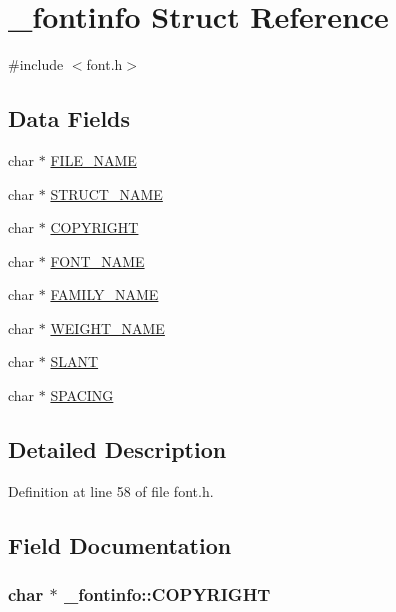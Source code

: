 \hypertarget{struct__fontinfo}{\section{\-\_\-fontinfo Struct Reference}
\label{struct__fontinfo}
}


{\ttfamily \#include $<$font.\-h$>$}

\subsection*{Data Fields}
\begin{DoxyCompactItemize}
\item 
char $\ast$ \hyperlink{struct__fontinfo_a86ca02a864b7dccb21004f51bea22ed3}{F\-I\-L\-E\-\_\-\-N\-A\-M\-E}
\item 
char $\ast$ \hyperlink{struct__fontinfo_a861ecb4b5f190ccd1e71b38270240f86}{S\-T\-R\-U\-C\-T\-\_\-\-N\-A\-M\-E}
\item 
char $\ast$ \hyperlink{struct__fontinfo_a7f4b0949fe49cf3fac04f225e1f36ed2}{C\-O\-P\-Y\-R\-I\-G\-H\-T}
\item 
char $\ast$ \hyperlink{struct__fontinfo_a6c0f76f2668446a1c37ecab8d4e286a5}{F\-O\-N\-T\-\_\-\-N\-A\-M\-E}
\item 
char $\ast$ \hyperlink{struct__fontinfo_a4af43750caadb3ae9d7375f0afdcd171}{F\-A\-M\-I\-L\-Y\-\_\-\-N\-A\-M\-E}
\item 
char $\ast$ \hyperlink{struct__fontinfo_a2f528cb5c1bceb6afd91ad138472d071}{W\-E\-I\-G\-H\-T\-\_\-\-N\-A\-M\-E}
\item 
char $\ast$ \hyperlink{struct__fontinfo_aff56d18df3b46ec10896d15ad3a2e164}{S\-L\-A\-N\-T}
\item 
char $\ast$ \hyperlink{struct__fontinfo_a0e6fafc8f03c70ce9c506d7a506fbba4}{S\-P\-A\-C\-I\-N\-G}
\end{DoxyCompactItemize}


\subsection{Detailed Description}


Definition at line 58 of file font.\-h.



\subsection{Field Documentation}
\hypertarget{struct__fontinfo_a7f4b0949fe49cf3fac04f225e1f36ed2}{
\subsubsection[{C\-O\-P\-Y\-R\-I\-G\-H\-T}]{\setlength{\rightskip}{0pt plus 5cm}char $\ast$ \-\_\-fontinfo\-::\-C\-O\-P\-Y\-R\-I\-G\-H\-T}}\label{struct__fontinfo_a7f4b0949fe49cf3fac04f225e1f36ed2}


